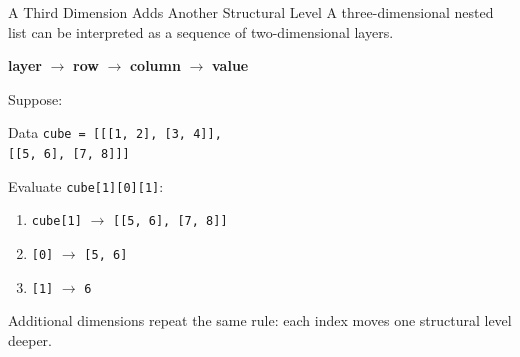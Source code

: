 \documentclass[aspectratio=169,10pt]{beamer}
\begin{document}
\begin{frame}{A Third Dimension Adds Another Structural Level}
  A three-dimensional nested list can be interpreted as a sequence of two-dimensional layers.

  \begin{center}
    \textbf{layer} $\rightarrow$ \textbf{row} $\rightarrow$ \textbf{column} $\rightarrow$ \textbf{value}
  \end{center}

  Suppose:

  \begin{block}{Data}
    \texttt{cube = [[[1, 2], [3, 4]],}\\
    \hspace*{0.64in}\texttt{[[5, 6], [7, 8]]]}
  \end{block}

  Evaluate \texttt{cube[1][0][1]}:

  \begin{enumerate}
    \item \texttt{cube[1]} $\rightarrow$ \texttt{[[5, 6], [7, 8]]}
    \item \texttt{[0]} $\rightarrow$ \texttt{[5, 6]}
    \item \texttt{[1]} $\rightarrow$ \texttt{6}
  \end{enumerate}

  \begin{keyidea}
    Additional dimensions repeat the same rule: each index moves one structural level deeper.
  \end{keyidea}
\end{frame}
\end{document}
